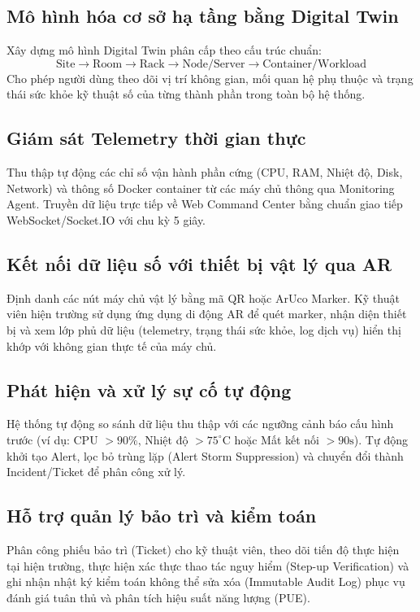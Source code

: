 \subsection{Mô hình hóa cơ sở hạ tầng bằng Digital Twin}
Xây dựng mô hình Digital Twin phân cấp theo cấu trúc chuẩn:
\begin{equation*}
\text{Site} \longrightarrow \text{Room} \longrightarrow \text{Rack} \longrightarrow \text{Node/Server} \longrightarrow \text{Container/Workload}
\end{equation*}
Cho phép người dùng theo dõi vị trí không gian, mối quan hệ phụ thuộc và trạng thái sức khỏe kỹ thuật số của từng thành phần trong toàn bộ hệ thống.

\subsection{Giám sát Telemetry thời gian thực}
Thu thập tự động các chỉ số vận hành phần cứng (CPU, RAM, Nhiệt độ, Disk, Network) và thông số Docker container từ các máy chủ thông qua Monitoring Agent. Truyền dữ liệu trực tiếp về Web Command Center bằng chuẩn giao tiếp WebSocket/Socket.IO với chu kỳ 5 giây.

\subsection{Kết nối dữ liệu số với thiết bị vật lý qua AR}
Định danh các nút máy chủ vật lý bằng mã QR hoặc ArUco Marker. Kỹ thuật viên hiện trường sử dụng ứng dụng di động AR để quét marker, nhận diện thiết bị và xem lớp phủ dữ liệu (telemetry, trạng thái sức khỏe, log dịch vụ) hiển thị khớp với không gian thực tế của máy chủ.

\subsection{Phát hiện và xử lý sự cố tự động}
Hệ thống tự động so sánh dữ liệu thu thập với các ngưỡng cảnh báo cấu hình trước (ví dụ: CPU $> 90\%$, Nhiệt độ $> 75^\circ\text{C}$ hoặc Mất kết nối $> 90\text{s}$). Tự động khởi tạo Alert, lọc bỏ trùng lặp (Alert Storm Suppression) và chuyển đổi thành Incident/Ticket để phân công xử lý.

\subsection{Hỗ trợ quản lý bảo trì và kiểm toán}
Phân công phiếu bảo trì (Ticket) cho kỹ thuật viên, theo dõi tiến độ thực hiện tại hiện trường, thực hiện xác thực thao tác nguy hiểm (Step-up Verification) và ghi nhận nhật ký kiểm toán không thể sửa xóa (Immutable Audit Log) phục vụ đánh giá tuân thủ và phân tích hiệu suất năng lượng (PUE).

